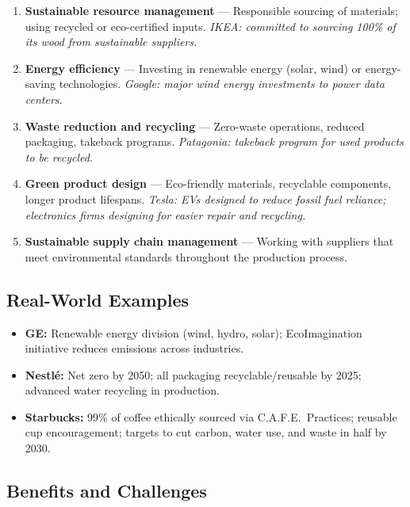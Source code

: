\documentclass[11pt, letterpaper]{article}
\begin{document}
\begin{enumerate}[leftmargin=*, label=\textbf{\arabic*.}]
  \item \textbf{Sustainable resource management} --- Responsible sourcing of materials; using recycled or eco-certified inputs. \textit{IKEA: committed to sourcing 100\% of its wood from sustainable suppliers.}
  \item \textbf{Energy efficiency} --- Investing in renewable energy (solar, wind) or energy-saving technologies. \textit{Google: major wind energy investments to power data centers.}
  \item \textbf{Waste reduction and recycling} --- Zero-waste operations, reduced packaging, takeback programs. \textit{Patagonia: takeback program for used products to be recycled.}
  \item \textbf{Green product design} --- Eco-friendly materials, recyclable components, longer product lifespans. \textit{Tesla: EVs designed to reduce fossil fuel reliance; electronics firms designing for easier repair and recycling.}
  \item \textbf{Sustainable supply chain management} --- Working with suppliers that meet environmental standards throughout the production process.
\end{enumerate}

\subsection{Real-World Examples}

\begin{itemize}[leftmargin=*]
  \item \textbf{GE:} Renewable energy division (wind, hydro, solar); EcoImagination initiative reduces emissions across industries.
  \item \textbf{Nestlé:} Net zero by 2050; all packaging recyclable/reusable by 2025; advanced water recycling in production.
  \item \textbf{Starbucks:} 99\% of coffee ethically sourced via C.A.F.E.\ Practices; reusable cup encouragement; targets to cut carbon, water use, and waste in half by 2030.
\end{itemize}

\subsection{Benefits and Challenges}
\end{document}
